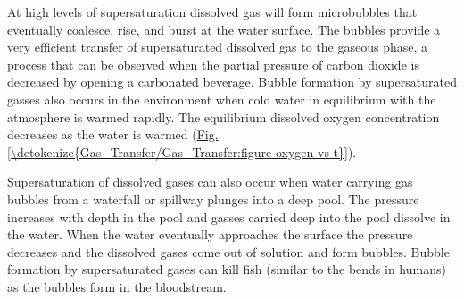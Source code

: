 \documentclass[letterpaper,10pt,english]{sphinxmanual}
\begin{document}
At high levels of supersaturation dissolved gas will form microbubbles that eventually coalesce, rise, and burst at the water surface. The bubbles provide a very efficient transfer of supersaturated dissolved gas to the gaseous phase, a process that can be observed when the partial pressure of carbon dioxide is decreased by opening a carbonated beverage. Bubble formation by supersaturated gasses also occurs in the environment when cold water in equilibrium with the atmosphere is warmed rapidly. The equilibrium dissolved oxygen concentration decreases as the water is warmed (\hyperref[\detokenize{Gas_Transfer/Gas_Transfer:figure-oxygen-vs-t}]{Fig.\@ \ref{\detokenize{Gas_Transfer/Gas_Transfer:figure-oxygen-vs-t}}}).

Supersaturation of dissolved gases can also occur when water carrying gas bubbles from a waterfall or spillway plunges into a deep pool. The pressure increases with depth in the pool and gasses carried deep into the pool dissolve in the water. When the water eventually approaches the surface the pressure decreases and the dissolved gases come out of solution and form bubbles. Bubble formation by supersaturated gases can kill fish (similar to the bends in humans) as the bubbles form in the bloodstream.
\end{document}
